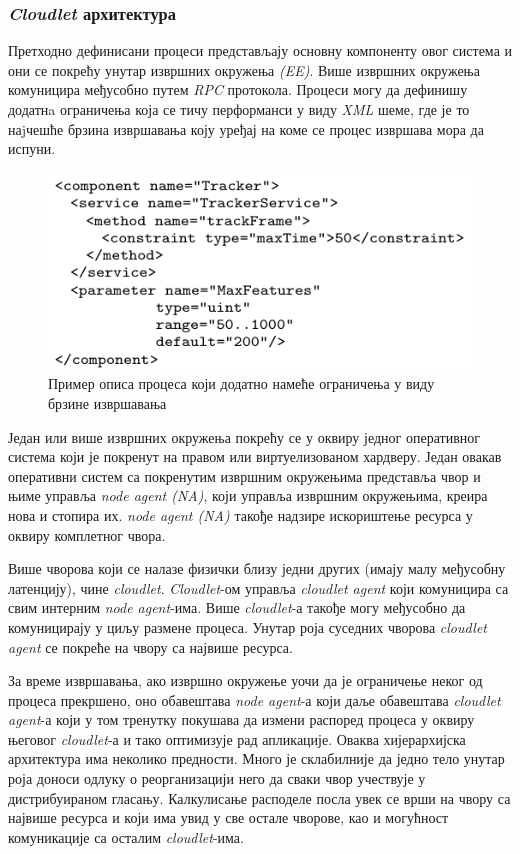 \subsubsection{\textit{Cloudlet} архитектура}

Претходно дефинисани процеси представљају основну компоненту овог система и они се покрећу унутар извршних окружења \textit{(EE)}. Више извршних окружења комуницира међусобно путем \textit{RPC} протокола. Процеси могу да дефинишу додатнa ограничења која се тичу перформанси у виду \textit{XML} шеме, где је то наjчешће брзина извршавања коју уређај на коме се процес извршава мора да испуни.  

\begin{figure}[H]
    \centering
    \includegraphics[width=1\textwidth]{images/cloudlet_constraints.png}
    \caption{Пример описа процеса који додатно намеће ограничења у виду брзине извршавања}
    \label{fig:cloudlet_constraints}
\end{figure}


Један или више извршних окружења покрећу се у оквиру једног оперативног система који је покренут на правом или виртуелизованом хардверу. Један овакав оперативни систем са покренутим извршним окружењима представља чвор и њиме управља \textit{node agent (NA)},  који управља извршним окружењима, креира нова и стопира их. \textit{node agent (NA)} такође надзире искориштење ресурса у оквиру комплетног чвора. 

Више чворова који се налазе физички близу једни других (имају малу међусобну латенцију), чине \textit{cloudlet}. \textit{Cloudlet}-ом управља  \textit{cloudlet agent} који комуницира са свим интерним \textit{node agent}-има. Више \textit{cloudlet}-а такође могу међусобно да комуницирају у циљу размене процеса. Унутар роја суседних чворова \textit{cloudlet agent} се покреће на чвору са највише ресурса.

За време извршавања, ако извршно окружење уочи да је ограничење неког од процеса прекршено, оно обавештава \textit{node agent}-а који даље обавештава \textit{cloudlet agent}-а који у том тренутку покушава да измени распоред процеса у оквиру његовог \textit{cloudlet}-а и тако оптимизује рад апликације. Оваква хијерархијска архитектура има неколико предности. Много је склабилније да једно тело унутар роја доноси одлуку о реорганизацији него да сваки чвор учествује у дистрибуираном гласању. Калкулисање расподеле посла увек се врши на чвору са највише ресурса и који има увид у све остале чворове, као и могућност комуникације са осталим \textit{cloudlet}-има.


